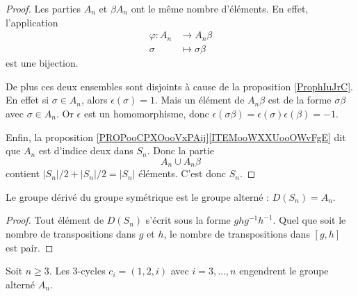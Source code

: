 \begin{proof}
    Les parties \( A_n\) et \( \beta A_n\) ont le même nombre d'éléments. En effet, l'application
    \begin{equation}
        \begin{aligned}
            \varphi\colon A_n&\to A_n\beta \\
            \sigma&\mapsto \sigma\beta 
        \end{aligned}
    \end{equation}
    est une bijection.

    De plus ces deux ensembles sont disjoints à cause de la proposition \ref{ProphIuJrC}. En effet si \( \sigma\in A_n\), alors \( \epsilon(\sigma)=1\). Mais un élément de \( A_n\beta\) est de la forme \( \sigma\beta\) avec \( \sigma\in A_n\). Or \( \epsilon\) est un homomorphisme, donc \( \epsilon(\sigma\beta)=\epsilon(\sigma)\epsilon(\beta)=-1\).

    Enfin, la proposition \ref{PROPooCPXOooVxPAij}\ref{ITEMooWXXUooOWvFgE} dit que \( A_n\) est d'indice deux dans \( S_n\). Donc la partie
    \begin{equation}
        A_n\cup A_n\beta
    \end{equation}
    contient \( | S_n |/2+| S_n |/2=| S_n |\) éléments. C'est donc \( S_n\).
\end{proof}

\begin{lemma}   \label{LemiApyfp}   
    Le groupe dérivé du groupe symétrique est le groupe alterné : \( D(S_n)=A_n\).
\end{lemma}

\begin{proof}
    Tout élément de \( D(S_n)\) s'écrit sous la forme \( ghg^{-1}h^{-1}\). Quel que soit le nombre de transpositions dans \( g\) et \( h\), le nombre de transpositions dans \( [g,h]\) est pair.
\end{proof}

\begin{proposition}     \label{PropsHlmvv}
    Soit \( n\geq 3\). Les \( 3\)-cycles \( c_i=(1,2,i)\) avec \( i=3,\ldots, n\) engendrent le groupe alterné \( A_n\).
\end{proposition}

